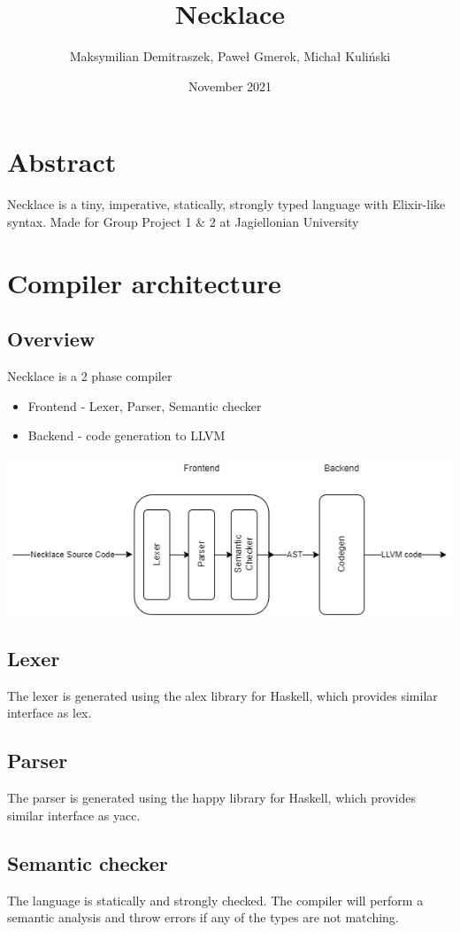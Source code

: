 \documentclass{article}
\title{Necklace}
\author{Maksymilian Demitraszek, Paweł Gmerek, Michał Kuliński}
\date{November 2021}
\begin{document}
\maketitle
\section{Abstract}
Necklace is a tiny, imperative, statically, strongly typed language with Elixir-like syntax.
Made for Group Project 1 \& 2 at Jagiellonian University


\section{Compiler architecture}
\subsection{Overview}
Necklace is a 2 phase compiler
\begin{itemize}
    \item Frontend - Lexer, Parser, Semantic checker
    \item Backend - code generation to LLVM
\end{itemize}
\begin{center}
    \includegraphics[scale=0.5]{compiler}
\end{center}
\subsection{Lexer}
The lexer is generated using the alex library for Haskell, which provides similar interface as lex. 

\subsection{Parser}
The parser is generated using the happy library for Haskell, which provides similar interface as yacc. 


\subsection{Semantic checker}
The language is statically and strongly checked. The compiler will perform a semantic analysis and throw errors if any of the types are not matching. 
\end{document}
